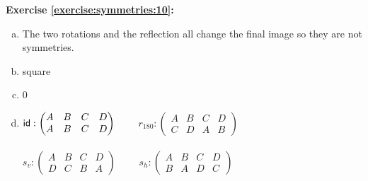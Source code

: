 \noindent\textbf{Exercise \ref{exercise:symmetries:10}:}
\begin{enumerate}[(a)]
\item
The two rotations and the reflection all change the final image so they are not symmetries.

\item
square

\item
0

\item
$\sf{id}: \begin{pmatrix}
A & B & C & D\\
A & B & C & D
\end{pmatrix}$
$\qquad r_{180}: \begin{pmatrix}
A & B & C & D\\
C & D & A & B
\end{pmatrix}$\\
\\
$s_{v}: \begin{pmatrix}
A & B & C & D\\
D & C & B & A
\end{pmatrix}$
$\qquad s_{h}: \begin{pmatrix}
A & B & C & D\\
B & A & D & C
\end{pmatrix}$
\end{enumerate}

